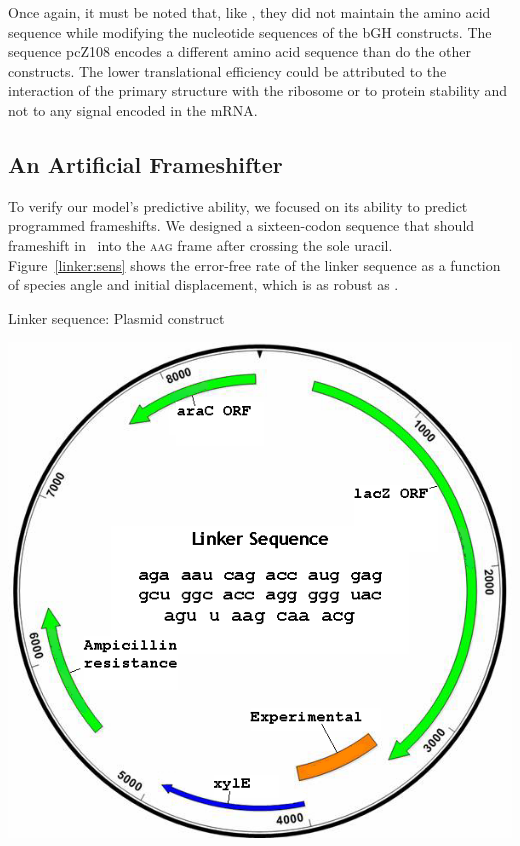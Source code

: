 \documentclass[twocolumn]{article}
\begin{document}
Once again, it must be noted that, like \citeauthor{weiss87}, they
did not maintain the amino acid sequence while modifying the nucleotide sequences of the bGH constructs.
The sequence pcZ108 encodes a different amino acid sequence than do the other constructs.
The lower translational efficiency could be attributed to the interaction
of the primary structure with the ribosome or to protein stability and not to any signal encoded
in the mRNA.

\subsection{An Artificial Frameshifter}
\label{section:linker}

To verify our model's predictive ability, we focused on its ability to
predict programmed frameshifts. We designed a sixteen-codon sequence
that should frameshift in \ecoli\ into
the \textsc{aag} frame after crossing the sole uracil.  Figure~\ref{linker:sens}
shows the error-free rate of the linker sequence as a function of species
angle and initial displacement, which is as robust as \prfB.

\begin{cfigure}
  \caption{Linker sequence: Plasmid construct}
  \label{linker:plasmid}
  \includegraphics[width=\linewidth]{linker/plasmid}
\end{cfigure}
\end{document}
